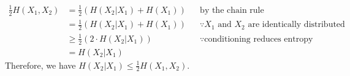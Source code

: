 \documentclass[
  coursecode={MTHE 474},
  assignmentname={Homework \homeworknumber},
  studentnumber=20053722,
  name={Bryan Hoang}
]{
  ltxanswer%
}
\begin{document}
\begin{questions}
\begin{parts}
      \part{}
      \begin{solution}
        \begin{align*}
          \frac{1}{2}H(X_{1},X_{2}) &= \frac{1}{2}(H(X_{2}|X_{1}) + H(X_{1})) & &\text{by the chain rule}                                              \\
                                    &= \frac{1}{2}(H(X_{2}|X_{1}) + H(X_{1})) & &\because X_{1} \text{ and } X_{2} \text{ are identically distributed} \\
                                    &\ge \frac{1}{2}(2 \cdot H(X_{2}|X_{1}))  & &\because \text{conditioning reduces entropy}                          \\
                                    &= H(X_{2}|X_{1})
        \end{align*}
        Therefore, we have \(\boxed{H(X_{2}|X_{1}) \le \frac{1}{2}H(X_{1},X_{2})}\).
      \end{solution}
    \end{parts}
  \end{questions}
\end{document}
